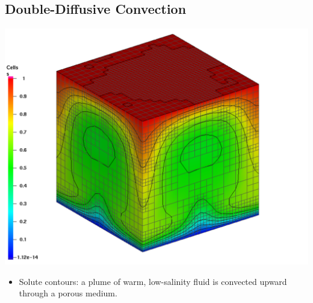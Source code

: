 \subsection*{Double-Diffusive Convection}
\begin{frame}[t]
  \begin{center}
    \includegraphics[width=.6\textwidth]{figures/dd}    
  \end{center}

  \begin{block}{}
    \begin{itemize}
    \item{Solute contours: a plume of
      warm, low-salinity fluid is convected upward through a porous medium.
      }
      \end{itemize}
  \end{block}
\end{frame}


